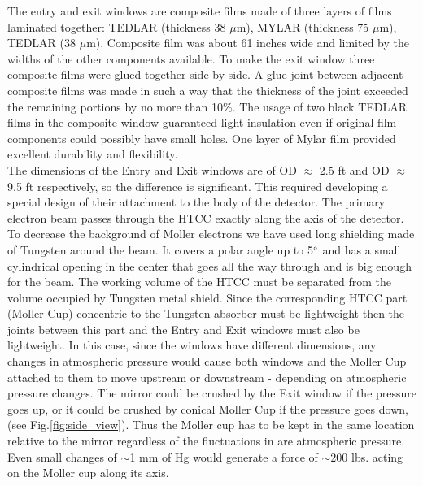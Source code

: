 \indent The entry and exit windows are composite films made of three layers of films laminated together: TEDLAR (thickness 38 $\mu$m), MYLAR (thickness 75 $\mu$m), TEDLAR (38 $\mu$m). Composite film was about 61 inches wide and limited by the widths of the other components available. To make the exit window three composite films were glued together side by side. A glue joint between adjacent composite films was made in such a way that the thickness of the joint exceeded the remaining portions by no more than 10\%. The usage of two black TEDLAR films in the composite window guaranteed light insulation even if original film components could possibly have small holes. One layer of Mylar film provided excellent durability and flexibility.
\\
\indent The dimensions of the Entry and Exit windows are of OD $\approx$ 2.5 ft and OD $\approx$ 9.5 ft respectively, so the difference is significant. This required developing a special design of their attachment to the body of the detector. The primary electron beam passes through the HTCC exactly along the axis of the detector. To decrease the background of Moller electrons we have used long shielding made of Tungsten around the beam. It covers a polar angle up to 5$\degree$ and has a small cylindrical opening in the center that goes all the way through and is big enough for the beam. The working volume of the HTCC must be separated from the volume occupied by Tungsten metal shield. Since the corresponding HTCC part (Moller Cup) concentric to the Tungsten absorber must be lightweight then the joints between this part and the Entry and Exit windows  must also be lightweight. In this case, since the windows have different dimensions, any changes in atmospheric pressure would cause both windows and the Moller Cup attached to them to move upstream or downstream - depending on atmospheric pressure changes. The mirror could be crushed by the Exit window if the pressure goes up, or it could be crushed by conical Moller Cup if the pressure goes down, (see Fig.\ref{fig:side_view}). Thus the Moller cup has to be kept in the same location relative to the mirror regardless of the fluctuations in are atmospheric pressure. Even small changes of $\sim$1 mm of Hg would generate a force of $\sim$200 lbs. acting on the Moller cup along its axis.  

